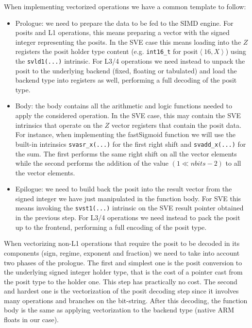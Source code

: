 When implementing vectorized operations we have a common template to follow: 
\begin{itemize}
    \item Prologue: we need to prepare the data to be fed to the SIMD engine. For posits and L1 operations, this means preparing a vector with the signed integer representing the posits. In the SVE case this means loading into the $Z$ registers the posit holder type content (e.g. \texttt{int16\_t} for posit$\left<16,X\right>$) using the \texttt{svld1(...)} intrinsic. For L3/4 operations we need instead to unpack the posit to the underlying backend (fixed, floating or tabulated) and load the backend type into registers as well, performing a full decoding of the posit type.
    \item Body: the body contains all the arithmetic and logic functions needed to apply the considered operation. In the SVE case, this may contain the SVE intrinsics that operate on the $Z$ vector registers that contain the posit data. For instance, when implementing the fastSigmoid function we will use the built-in intrinsics \texttt{svasr\_x(...)} for the first right shift and \texttt{sv\-add\_x(...)} for the sum. The first performs the same right shift on all the vector elements while the second performs the addition of the value $(1\ll nbits-2)$ to all the vector elements.
    \item Epilogue: we need to build back the posit into the result vector from the signed integer we have just manipulated in the function body. For SVE this means invoking the \texttt{svst1(...)} intrinsic on the SVE result pointer obtained in the previous step. For L3/4 operations we need instead to pack the posit up to the frontend, performing a full encoding of the posit type.
\end{itemize}

When vectorizing non-L1 operations that require the posit to be decoded in its components (sign, regime, exponent and fraction) we need to take into account two phases of the prologue. The first and simplest one is the posit conversion to the underlying signed integer holder type, that is the cost of a pointer cast from the posit type to the holder one. This step has practically no cost. The second and hardest one is the vectorization of the posit decoding step since it involves many operations and branches on the bit-string. After this decoding, the function body is the same as applying vectorization to the backend type (native ARM floats in our case).

